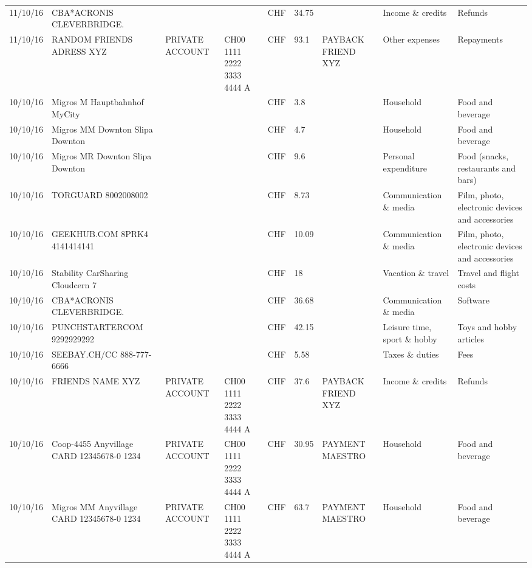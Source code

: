 \begin{landscape}
\begin{adjustwidth}{-2cm}{-2cm}
\begin{tiny}
\begin{longtable}{lp{4cm}llllp{3cm}ll}
		11/10/16 & CBA*ACRONIS              CLEVERBRIDGE. &       &       & CHF   & 34.75 &       & Income \& credits & Refunds \\
		11/10/16 & RANDOM FRIENDS ADRESS XYZ & PRIVATE ACCOUNT & CH00 1111 2222 3333 4444 A & CHF   & 93.1  & PAYBACK FRIEND XYZ & Other expenses & Repayments \\
		10/10/16 & Migros M Hauptbahnhof    MyCity &       &       & CHF   & 3.8   &       & Household & Food and beverage \\
		10/10/16 & Migros MM Downton Slipa   Downton &       &       & CHF   & 4.7   &       & Household & Food and beverage \\
		10/10/16 & Migros MR Downton Slipa   Downton &       &       & CHF   & 9.6   &       & Personal expenditure & Food (snacks, restaurants and bars) \\
		10/10/16 & TORGUARD                 8002008002 &       &       & CHF   & 8.73  &       & Communication \& media & Film, photo, electronic devices and accessories \\
		10/10/16 & GEEKHUB.COM  8PRK4        4141414141 &       &       & CHF   & 10.09 &       & Communication \& media & Film, photo, electronic devices and accessories \\
		10/10/16 & Stability CarSharing      Cloudcern 7 &       &       & CHF   & 18    &       & Vacation \& travel & Travel and flight costs \\
		10/10/16 & CBA*ACRONIS              CLEVERBRIDGE. &       &       & CHF   & 36.68 &       & Communication \& media & Software \\
		10/10/16 & PUNCHSTARTERCOM           9292929292 &       &       & CHF   & 42.15 &       & Leisure time, sport \& hobby & Toys and hobby articles \\
		10/10/16 & SEEBAY.CH/CC               888-777-6666 &       &       & CHF   & 5.58  &       & Taxes \& duties & Fees \\
		10/10/16 & FRIENDS NAME XYZ & PRIVATE ACCOUNT & CH00 1111 2222 3333 4444 A & CHF   & 37.6  & PAYBACK FRIEND XYZ & Income \& credits & Refunds \\
		10/10/16 & Coop-4455 Anyvillage CARD 12345678-0 1234 & PRIVATE ACCOUNT & CH00 1111 2222 3333 4444 A & CHF   & 30.95 & PAYMENT MAESTRO & Household & Food and beverage \\
		10/10/16 & Migros MM Anyvillage CARD 12345678-0 1234 & PRIVATE ACCOUNT & CH00 1111 2222 3333 4444 A & CHF   & 63.7  & PAYMENT MAESTRO & Household & Food and beverage \\

\end{longtable}
\end{tiny}
\end{adjustwidth}
\end{landscape}
